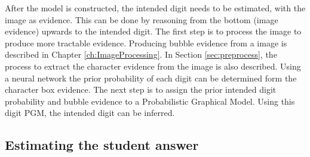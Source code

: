 

After the model is constructed, the intended digit needs to be estimated, with the image as evidence. This can be done by reasoning from the bottom (image evidence) upwards to the intended digit. The first step is to process the image to produce more tractable evidence. Producing bubble evidence from a image is described in Chapter \ref{ch:ImageProcessing}. In Section \ref{sec:preprocess}, the process to extract the character evidence from the image is also described. Using a neural network the prior probability of each digit can be determined form the character box evidence. The next step is to assign the prior intended digit probability and bubble evidence to a Probabilistic Graphical Model. Using this digit PGM, the intended digit can be inferred.

\subsection{Estimating the student answer}
\label{sec:studentAnswer}

